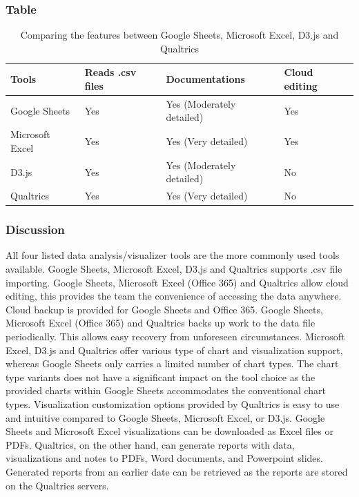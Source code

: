 \documentclass[10pt,journal,compsoc,draftclsnofoot]{IEEEtran}
\begin{document}
\subsubsection{Table}
\begin{center}
\begin{table}[H]
\begin{tabular}{ | m{10em} | m{15em} | m{15em} | m{15em} |  } 
\hline
\textbf{Tools}  & \textbf{Reads .csv files } & \textbf{Documentations} & \textbf{Cloud editing} \\ \hline
Google Sheets & Yes  & Yes (Moderately detailed) & Yes \\ \hline
Microsoft Excel & Yes & Yes (Very detailed) & Yes \\ \hline
D3.js & Yes & Yes (Moderately detailed) & No \\ \hline 
Qualtrics & Yes & Yes (Very detailed) & No \\ \hline 
\end{tabular}
\newline
\caption{Comparing the features between Google Sheets, Microsoft Excel, D3.js and Qualtrics}
\label{table:datatools}
\end{table}
\end{center}

\subsubsection{Discussion}
All four listed data analysis/visualizer tools are the more commonly used tools available.
Google Sheets, Microsoft Excel, D3.js and Qualtrics supports .csv file importing.
Google Sheets, Microsoft Excel (Office 365) and Qualtrics allow cloud editing, this provides the team the convenience of accessing the data anywhere.
Cloud backup is provided for Google Sheets and Office 365.
Google Sheets, Microsoft Excel (Office 365) and Qualtrics backs up work to the data file periodically.
This allows easy recovery from unforeseen circumstances. 
Microsoft Excel, D3.js and Qualtrics offer various type of chart and visualization support, whereas Google Sheets only carries a limited number of chart types.
The chart type variants does not have a significant impact on the tool choice as the provided charts within Google Sheets accommodates the conventional chart types.
Visualization customization options provided by Qualtrics is easy to use and intuitive compared to Google Sheets, Microsoft Excel, or D3.js.
Google Sheets and Microsoft Excel visualizations can be downloaded as Excel files or PDFs.
Qualtrics, on the other hand, can generate reports with data, visualizations and notes to PDFs, Word documents, and Powerpoint slides.
Generated reports from an earlier date can be retrieved as the reports are stored on the Qualtrics servers.
\end{document}
